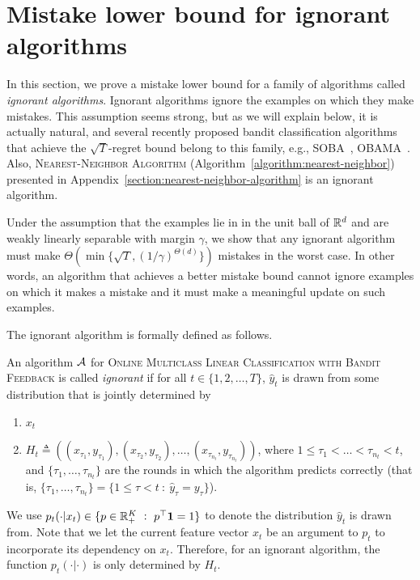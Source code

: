 \section{Mistake lower bound for ignorant algorithms}
\label{section:mistake-lower-bound-for-ignorant-algorithms}

In this section, we prove a mistake lower bound for a family of algorithms
called \textit{ignorant algorithms}. Ignorant algorithms ignore the examples on
which they make mistakes. This assumption seems strong, but as we will explain
below, it is actually natural, and several recently proposed bandit
classification algorithms that achieve the $\sqrt{T}$-regret bound belong to
this family, e.g., SOBA~\citep{Beygelzimer-Orabona-Zhang-2017},
OBAMA~\citep{Foster-Kale-Luo-Mohri-Sridharan-2018}. Also,
\textsc{Nearest-Neighbor Algorithm} (Algorithm~\ref{algorithm:nearest-neighbor})
presented in Appendix~\ref{section:nearest-neighbor-algorithm} is an ignorant
algorithm.

Under the assumption that the examples lie in in the unit ball of $\mathbb{R}^d$ and are
weakly linearly separable with margin $\gamma$, we show that any ignorant
algorithm must make $\Theta\left(\min\{\sqrt{T},
(1/\gamma)^{\Theta(d)}\}\right)$ mistakes in the worst case. In other words, an
algorithm that achieves a better mistake bound cannot ignore examples on which
it makes a mistake and it must make a meaningful update on such examples.

The ignorant algorithm is formally defined as follows.
\begin{definition}
\label{definition:ignorant-algorithm}
An algorithm $\mathcal{A}$ for \textsc{Online Multiclass Linear Classification with
Bandit Feedback} is called \emph{ignorant} if for all $t \in \{1,2,\dots,T\}$,
$\widehat y_t$ is drawn from some distribution that is jointly determined by
\begin{enumerate}
\item $x_t$
\item $H_t \triangleq \left( (x_{\tau_1}, y_{\tau_1}), (x_{\tau_2}, y_{\tau_2}), \ldots, (x_{\tau_{n_t}}, y_{\tau_{n_t}}) \right)$,
where $1 \le \tau_1 < \dots < \tau_{n_t} < t$, and $\{\tau_1, \ldots, \tau_{n_t}\}$
are the rounds in which the algorithm predicts correctly (that is,
$\{\tau_1, \dots, \tau_{n_t}\} = \{1 \le \tau < t ~:~ \widehat y_\tau=y_\tau\}$).
\end{enumerate}
We use $p_t(\cdot|x_t)\in \{p\in \mathbb{R}_+^K ~:~ p^\top\mathbf{1}=1\}$ to denote
the distribution $\widehat y_t$ is drawn from. Note that we let the current
feature vector $x_t$ be an argument to $p_t$ to incorporate its dependency on
$x_t$. Therefore, for an ignorant algorithm, the function $p_t(\cdot|\cdot)$ is
only determined by $H_t$.
\end{definition}

